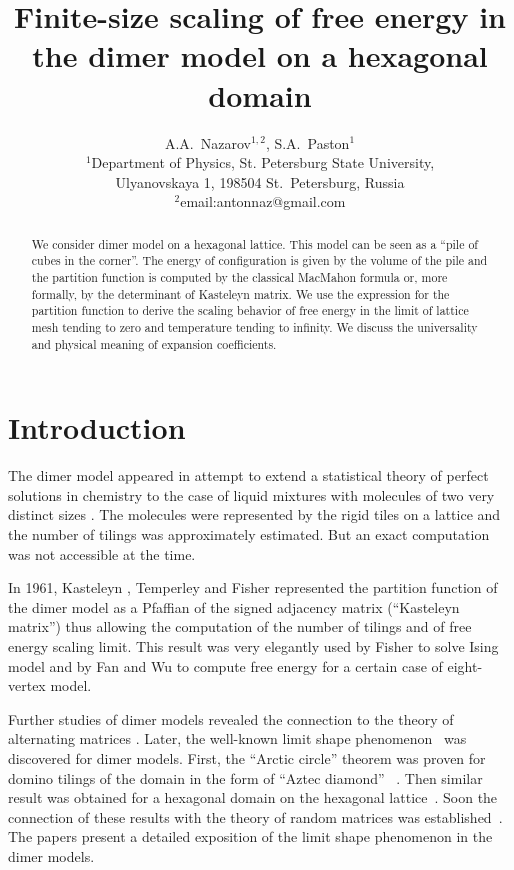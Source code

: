 \documentclass{article}
\begin{document}
\title{Finite-size scaling of free energy in the dimer model on a hexagonal domain}

\author{A.A.~Nazarov$^{1,2}$, S.A.~Paston$^{1}$\\
{\small
  $^{1}$Department of Physics, St. Petersburg State University,} \\
{\small  Ulyanovskaya 1, 198504 St.~Petersburg, Russia}\\
\small{$^{2}$email:antonnaz@gmail.com}
}
\date{}
\maketitle

\begin{abstract}
  We consider dimer model on a hexagonal lattice. This model can be seen as a ``pile of cubes in the
  corner''. The energy of configuration is given by the volume of the pile and the partition
  function is computed by the classical MacMahon formula or, more formally, by the determinant of
  Kasteleyn matrix. We use the expression for the partition function to derive the scaling behavior
  of free energy in the limit of lattice mesh tending to zero and temperature tending to infinity.
  We discuss the universality and physical meaning of expansion coefficients.
\end{abstract}


\section*{Introduction}
\label{sec:introduction}
The dimer model appeared in attempt to extend a statistical theory of perfect solutions in chemistry
to the case of liquid mixtures with molecules of two very distinct sizes \cite{Fowler-1937}. The
molecules were represented by the rigid tiles on a lattice and the number of tilings was
approximately estimated. But an exact computation was not accessible at the time.

In 1961, Kasteleyn \cite{P.W-1961}, Temperley and Fisher \cite{doi:10.1080/14786436108243366}
represented the partition function of the dimer model as a Pfaffian of the signed adjacency matrix
(``Kasteleyn matrix'') thus allowing the computation of the number of tilings and of free energy scaling limit.
This result was very elegantly used by Fisher to solve Ising model \cite{fisher1966dimer} and by Fan
and Wu \cite{Fan-1970} to compute free energy for a certain case of eight-vertex model.

Further studies of dimer models revealed the connection to the theory of alternating matrices
\cite{elkies1992alternating1,elkies1992alternating2}. Later, the well-known limit shape
phenomenon~\cite{vershik1977kerov} was discovered for dimer models. First, the ``Arctic circle''
theorem was proven for domino tilings of the domain in the form of ``Aztec diamond''
~\cite{1998math......1068J}. Then similar result was obtained for a hexagonal domain on the
hexagonal lattice~\cite{cohn1998shape}. Soon the connection of these results with the theory of
random matrices was established~\cite{johansson2002non}. The papers
\cite{kenyon2006dimers,kenyon2009lectures} present a detailed exposition of the limit shape
phenomenon in the dimer models.
\end{document}
